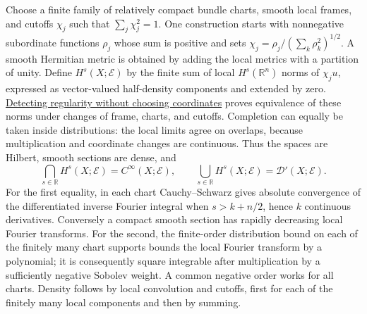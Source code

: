 \documentclass[
  11pt,
]{article}
\begin{document}
Choose a finite family of relatively compact bundle charts, smooth local
frames, and cutoffs \(\chi_j\) such that \(\sum_j\chi_j^2=1\). One
construction starts with nonnegative subordinate functions \(\rho_j\)
whose sum is positive and sets \(\chi_j=\rho_j/(\sum_k\rho_k^2)^{1/2}\).
A smooth Hermitian metric is obtained by adding the local metrics with a
partition of unity. Define \(H^s(X;\mathcal E)\) by the finite sum of
local \(H^s(\mathbb R^n)\) norms of \(\chi_j u\), expressed as
vector-valued half-density components and extended by zero.
\href{geometric-microlocal-calculus.pdf}{Detecting regularity without
choosing coordinates} proves equivalence of these norms under changes of
frame, charts, and cutoffs. Completion can equally be taken inside
distributions: the local limits agree on overlaps, because
multiplication and coordinate changes are continuous. Thus the spaces
are Hilbert, smooth sections are dense, and \[
\bigcap_{s\in\mathbb R}H^s(X;\mathcal E)=C^\infty(X;\mathcal E),
\qquad
\bigcup_{s\in\mathbb R}H^s(X;\mathcal E)=\mathcal D'(X;\mathcal E).
\tag{I1}
\] For the first equality, in each chart Cauchy--Schwarz gives absolute
convergence of the differentiated inverse Fourier integral when
\(s>k+n/2\), hence \(k\) continuous derivatives. Conversely a compact
smooth section has rapidly decreasing local Fourier transforms. For the
second, the finite-order distribution bound on each of the finitely many
chart supports bounds the local Fourier transform by a polynomial; it is
consequently square integrable after multiplication by a sufficiently
negative Sobolev weight. A common negative order works for all charts.
Density follows by local convolution and cutoffs, first for each of the
finitely many local components and then by summing.
\end{document}
